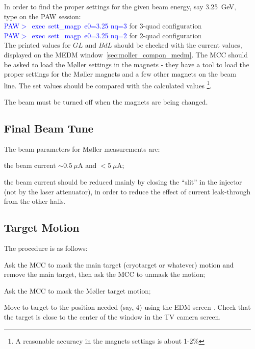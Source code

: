 { In order to find the proper settings for the given beam energy, say 3.25~GeV, 
 type on the PAW session: \\ 
 \hspace*{0.5cm} \textcolor{blue}{PAW$>$~exec~sett\_magp~e0=3.25 nq=3} for 3-quad configuration \\
 \hspace*{0.5cm} \textcolor{blue}{PAW$>$~exec~sett\_magp~e0=3.25 nq=2} for 2-quad configuration \\
 The printed values for $GL$ and $BdL$ should be checked with the current values,
 displayed on the MEDM window~\ref{sec:moller_compon_medm}. 
 The MCC should be asked to load the M{\o}ller settings in the magnets -
 they have a tool to load the proper settings for the M{\o}ller
 magnets and a few other magnets on the beam line. 
 The set values should be compared with the calculated values%
 \footnote{A reasonable accuracy in the  magnets settings is about 1-2\%}.
 \begin{safetyen}{5}{2}
   The beam must be turned off when the magnets are being changed.
 \end{safetyen}


\subsection {Final Beam Tune}
\label{sec:moller_oper_finalbeam}

 The beam parameters for M{\o}ller measurements
 are: 
   \begin{list}{--}{\setlength{\itemsep}{-0.15cm}}        
     \item \begin{safetyen}{5}{0} the beam current $\sim{}0.5~\mu$A and $<5~\mu$A;
            \end{safetyen}
     \item the beam current should be reduced mainly by closing the ``slit''
           in the injector (not by the laser attenuator), in order to
           reduce the effect of current leak-through from the other halls.
   \end{list}


\subsection {Target Motion}
\label{sec:moller_oper_target}
 The procedure is as follows:
   \begin{list}{--}{\setlength{\itemsep}{-0.15cm}}        
     \item Ask the MCC to mask the main target (cryotarget or whatever) motion
           and remove the main target, then ask the MCC to unmask the motion;
     \item Ask the MCC to mask the M{\o}ller target motion;
     \item Move to target to the position needed (say, 4) using
           the EDM screen .
           Check that the target is close to the center of the window
           in the TV camera screen. 
   \end{list}

}
